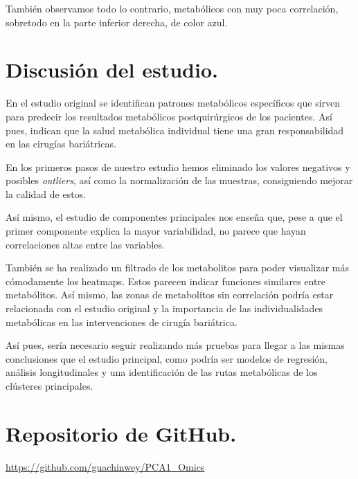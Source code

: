 \documentclass[
]{article}
\begin{document}
También observamos todo lo contrario, metabólicos con muy poca
correlación, sobretodo en la parte inferior derecha, de color azul.

\section{Discusión del estudio.}\label{discusiuxf3n-del-estudio.}

En el estudio original se identifican patrones metabólicos específicos
que sirven para predecir los resultados metabólicos postquirúrgicos de
los pacientes. Así pues, indican que la salud metabólica individual
tiene una gran responsabilidad en las cirugías bariátricas.

En los primeros pasos de nuestro estudio hemos eliminado los valores
negativos y posibles \emph{outliers}, así como la normalización de las
muestras, consiguiendo mejorar la calidad de estos.

Así mismo, el estudio de componentes principales nos enseña que, pese a
que el primer componente explica la mayor variabilidad, no parece que
hayan correlaciones altas entre las variables.

También se ha realizado un filtrado de los metabolitos para poder
visualizar más cómodamente los heatmaps. Estos parecen indicar funciones
similares entre metabólitos. Así mismo, las zonas de metabolitos sin
correlación podría estar relacionada con el estudio original y la
importancia de las individualidades metabólicas en las intervenciones de
cirugía bariátrica.

Así pues, sería necesario seguir realizando más pruebas para llegar a
las mismas conclusiones que el estudio principal, como podría ser
modelos de regresión, análisis longitudinales y una identificación de
las rutas metabólicas de los clústeres principales.

\section{Repositorio de GitHub.}\label{repositorio-de-github.}

\url{https://github.com/guachinwey/PCA1_Omics}
\end{document}
